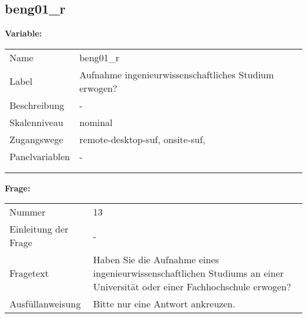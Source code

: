 	
	
	\subsection{beng01\_r}
	\label{subSection:beng01_r}

	\noindent\textbf{Variable:}\\
		\begin{tabular}{lL{11.3cm}}
			\label{tableVariable:beng01_r}
			Name & beng01\_r \\
			Label & Aufnahme ingenieurwissenschaftliches Studium erwogen? \\
			Beschreibung & - \\
			Skalenniveau & nominal \\
			Zugangswege &
				remote-desktop-suf,
				onsite-suf,
 \\
			Panelvariablen & -
			 \\
			 \\
 \\
		\end{tabular}

		\vspace*{1 cm}
		\noindent\textbf{Frage:}\\
		\begin{tabular}{lL{11.3cm}}
			\label{tableQuestion:beng01_r}
			Nummer & 13 \\
			Einleitung der Frage & - \\
			Fragetext & Haben Sie die Aufnahme eines ingenieurwissenschaftlichen Studiums an einer Universität oder einer Fachhochschule erwogen? \\
			Ausfüllanweisung & Bitte nur eine Antwort ankreuzen. \\
		\end{tabular}





